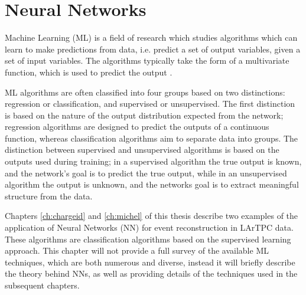 \chapter{\label{ch:ml}Neural Networks} 

\minitoc

Machine Learning (ML) is a field of research which studies algorithms which 
can learn to make predictions from data, i.e. predict a set of output variables,
given a set of input variables. The algorithms typically take the form of a
multivariate function, which is used to predict the output \cite{Reed1999}.

ML algorithms are often classified into four groups based on two distinctions: 
regression or classification, and supervised or unsupervised. The first
distinction is based on the nature of the output distribution expected from the
network; regression algorithms are designed to predict the outputs of a 
continuous function, whereas classification algorithms aim to separate data 
into groups. The distinction between supervised and unsupervised algorithms is 
based on the outputs used during training; in a supervised algorithm the true 
output is known, and the network's goal is to predict the true output, while 
in an unsupervised algorithm the output is unknown, and the networks goal is 
to extract meaningful structure from the data\cite{Lecun2015}.

Chapters \ref{ch:chargeid} and \ref{ch:michel} of this thesis describe two 
examples of the application of Neural Networks (NN) for event reconstruction 
in LArTPC data. These algorithms are classification algorithms based on the
supervised learning approach. This chapter will not provide a full survey of
the available ML techniques, which are both numerous and diverse, instead it 
will briefly describe the theory behind NNs, as well as providing details of 
the techniques used in the subsequent chapters. 

